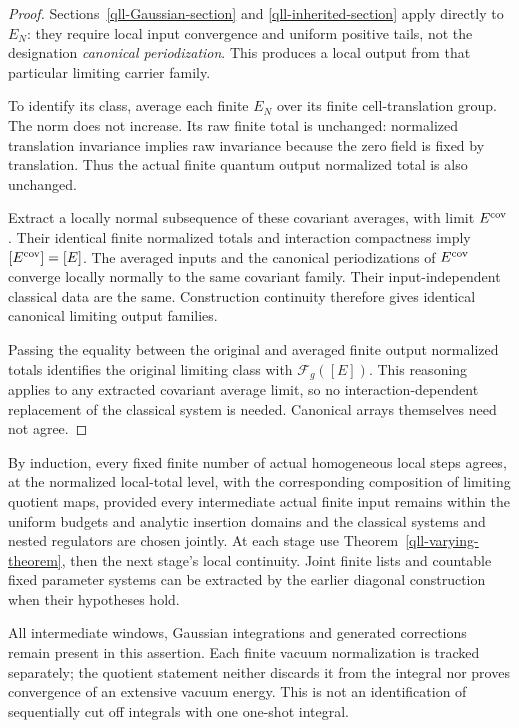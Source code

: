 \begin{proof}
Sections~\ref{qll-Gaussian-section} and
\ref{qll-inherited-section} apply directly to \(E_N\):
they require local input convergence and uniform positive
tails, not the designation \emph{canonical periodization}.
This produces a local output from that particular limiting
carrier family.

To identify its class, average each finite \(E_N\) over its
finite cell-translation group. The norm does not increase.
Its raw finite total is unchanged: normalized translation
invariance implies raw invariance because the zero field
is fixed by translation. Thus the actual finite quantum
output normalized total is also unchanged.

Extract a locally normal subsequence of these covariant
averages, with limit \(E^{\rm cov}\). Their identical finite
normalized totals and interaction compactness imply
\([E^{\rm cov}]=[E]\). The averaged inputs and the canonical
periodizations of \(E^{\rm cov}\) converge locally normally
to the same covariant family. Their input-independent
classical data are the same. Construction continuity therefore
gives identical canonical limiting output families.

Passing the equality between the original and averaged
finite output normalized totals identifies the original
limiting class with \(\mathcal F_g([E])\). This reasoning
applies to any extracted covariant average limit, so no
interaction-dependent replacement of the classical system
is needed. Canonical arrays themselves need not agree.
\end{proof}

By induction, every fixed finite number of actual homogeneous
local steps agrees, at the normalized local-total level, with
the corresponding composition of limiting quotient maps,
provided every intermediate actual finite input remains within
the uniform budgets and analytic insertion domains and the
classical systems and nested regulators are chosen jointly.
At each stage use Theorem~\ref{qll-varying-theorem}, then the
next stage's local continuity. Joint finite lists and countable
fixed parameter systems can be extracted by the earlier
diagonal construction when their hypotheses hold.

All intermediate windows, Gaussian integrations and generated
corrections remain present in this assertion. Each finite
vacuum normalization is tracked separately; the quotient
statement neither discards it from the integral nor proves
convergence of an extensive vacuum energy. This is not an
identification of sequentially cut off integrals with one
one-shot integral.

